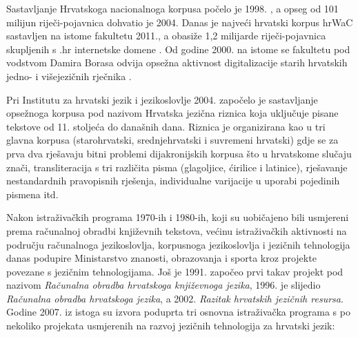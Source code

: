 \begin{multicols}{2}
 Sastavljanje Hrvatskoga nacionalnoga
korpusa \cite{str27} počelo je 1998. \cite{pro8, boo5}, a opseg od 101 milijun
riječi-pojavnica dohvatio je 2004. \cite{pro9} Danas je najveći hrvatski korpus
hrWaC sastavljen na istome fakultetu 2011., a obasiže 1,2 milijarde
riječi-pojavnica skupljenih s .hr internetske domene \cite{pro10}. Od godine
2000. na istome se fakultetu pod vodstvom Damira Borasa odvija opsežna
aktivnost digitalizacije starih hrvatskih jedno- i višejezičnih rječnika
\cite{str28}.


Pri Institutu za hrvatski jezik i jezikoslovlje 2004. započelo je sastavljanje opsežnoga korpusa pod nazivom Hrvatska jezična riznica \cite{str29, pro11} koja uključuje pisane tekstove od 11. stoljeća do današnih dana. Riznica je organizirana kao u tri glavna korpusa (starohrvatski, srednjehrvatski i suvremeni hrvatski) gdje se za prva dva rješavaju bitni problemi dijakronijskih korpusa što u hrvatskome slučaju znači, transliteracija s tri različita pisma (glagoljice, ćirilice i latinice), rješavanje nestandardnih pravopisnih rješenja, individualne varijacije u uporabi pojedinih pismena itd.

Nakon istraživačkih programa 1970-ih i 1980-ih, koji su uobičajeno bili usmjereni prema računalnoj obradbi književnih tekstova, većinu istraživačkih aktivnosti na području računalnoga jezikoslovlja, korpusnoga jezikoslovlja i jezičnih tehnologija danas podupire Ministarstvo znanosti, obrazovanja i sporta kroz projekte povezane s jezičnim tehnologijama. Još je 1991. započeo prvi takav projekt pod nazivom \emph{Računalna obradba hrvatskoga književnoga jezika}, 1996. je slijedio \emph{Računalna obradba hrvatskoga jezika}, a 2002. \emph{Razitak hrvatskih jezičnih resursa}. Godine 2007. iz istoga su izvora poduprta tri osnovna istraživačka programa s po nekoliko projekata usmjerenih na razvoj jezičnih tehnologija za hrvatski jezik:


\end{multicols}
